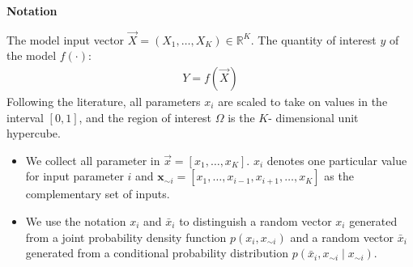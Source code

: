 \begin{frame}\begin{center}
		\LARGE\textbf{Notation}
\end{center}\end{frame}
\begin{frame}
The model input vector $\vec{X} = (X_1, \hdots, X_K) \in \mathbb{R}^K$. The quantity of interest $y$ of the model $f(\cdot)$:
%
\begin{align*}
 Y = f(\vec{X})
\end{align*}
%
Following the literature, all parameters $x_i$ are scaled to take on values in the interval $[0, 1]$, and the region of interest $\Omega$ is the $K$- dimensional unit hypercube.
\end{frame}
\begin{frame}
	\begin{itemize}\setlength\itemsep{1em}
		\item We collect all parameter in $\vec{x} = [x_1, \hdots, x_K]$. $x_i$ denotes one particular value for input parameter $i$ and $\textbf{x}_{\sim i} =  [x_1, \hdots, x_{i -1}, x_{i + 1}, \hdots, x_K]$ as the complementary set of inputs.
		\item We use the notation $x_i$ and $\bar{x}_{i}$ to distinguish a random vector $x_i$ generated from a joint probability density function $p(x_i, x_{\sim i})$ and a random vector $\bar{x}_i$ generated from a conditional probability distribution $p(\bar{x}_i, x_{\sim i} \mid x_{\sim i})$.
	\end{itemize}
\end{frame}
